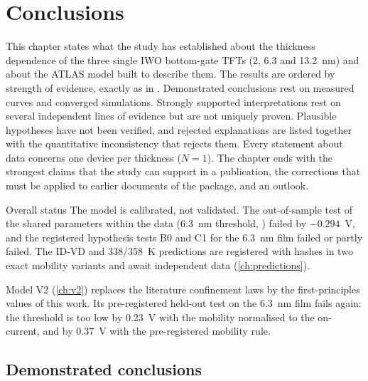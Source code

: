 \chapter{Conclusions}\label{ch:conclusions}

This chapter states what the study has established about the thickness dependence of the three single IWO bottom-gate TFTs (2, 6.3 and 13.2~nm) and about the ATLAS model built to describe them. The results are ordered by strength of evidence, exactly as in . Demonstrated conclusions rest on measured curves and converged simulations. Strongly supported interpretations rest on several independent lines of evidence but are not uniquely proven. Plausible hypotheses have not been verified, and rejected explanations are listed together with the quantitative inconsistency that rejects them. Every statement about data concerns one device per thickness ($N = 1$). The chapter ends with the strongest claims that the study can support in a publication, the corrections that must be applied to earlier documents of the package, and an outlook.

\begin{statusbox}{Overall status}
The model is calibrated, not validated. The out-of-sample test of the shared parameters within the data (6.3~nm threshold, ) failed by $-0.294$~V, and the registered hypothesis tests B0 and C1 for the 6.3~nm film failed or partly failed. The ID-VD and 338/358~K predictions are registered with hashes in two exact mobility variants and await independent data (\cref{ch:predictions}).

Model V2 (\cref{ch:v2}) replaces the literature confinement laws by the first-principles values of this work. Its
pre-registered held-out test on the 6.3~nm film fails again: the threshold is too low by 0.23~V with the mobility
normalised to the on-current, and by 0.37~V with the pre-registered mobility rule.
\end{statusbox}

\section{Demonstrated conclusions}\label{sec:concl-demonstrated}

